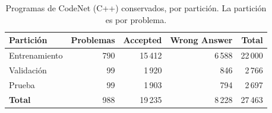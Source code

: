 \begin{table}[H]
\centering
\small
\begin{tabular}{|l|r|r|r|r|}
\hline
\textbf{Partición} & \textbf{Problemas} & \textbf{Accepted} & \textbf{Wrong Answer} & \textbf{Total} \\ \hline
Entrenamiento & 790 & 15\,412 & 6\,588 & 22\,000 \\ \hline
Validación & 99 & 1\,920 & 846 & 2\,766 \\ \hline
Prueba & 99 & 1\,903 & 794 & 2\,697 \\ \hline
\textbf{Total} & 988 & 19\,235 & 8\,228 & 27\,463 \\ \hline
\end{tabular}
\caption{Programas de CodeNet (C++) conservados, por partición. La partición es por problema.}
\label{tab:codenet_particiones}
\end{table}
